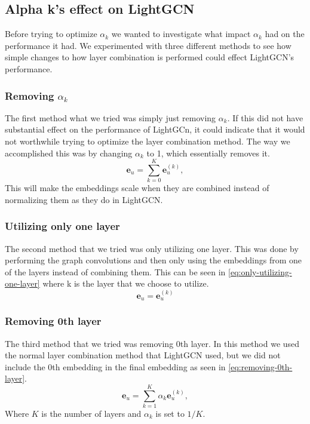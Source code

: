 \subsection{Alpha k's effect on LightGCN}\label{sec:method:alpha-k-effect}
Before trying to optimize $\alpha_k$ we wanted to investigate what impact $\alpha_k$ had on the performance it had.
We experimented with three different methods to see how simple changes to how layer combination is performed could effect LightGCN's performance.

\subsubsection{Removing $\alpha_k$}
The first method what we tried was simply just removing $\alpha_k$.
If this did not have substantial effect on the performance of LightGCn, it could indicate that it would not worthwhile trying to optimize the layer combination method.
The way we accomplished this was by changing $\alpha_k$ to 1, which essentially removes it.
\begin{equation}
    \mathbf{e}_u = \sum_{k=0}^{K} \mathbf{e}_u^{(k)},
    \label{eq:removing-alpha-k-lightgcn-sum}
\end{equation}
This will make the embeddings scale when they are combined instead of normalizing them as they do in LightGCN.

\subsubsection{Utilizing only one layer}
The second method that we tried was only utilizing one layer.
This was done by performing the graph convolutions and then only using the embeddings from one of the layers instead of combining them.
This can be seen in \autoref{eq:only-utilizing-one-layer} where k is the layer that we choose to utilize. 
\begin{equation}
	\mathbf{e}_u = \mathbf{e}_u^{(k)}
	\label{eq:only-utilizing-one-layer}
\end{equation}

\subsubsection{Removing 0th layer}
The third method that we tried was removing 0th layer.
In this method we used the normal layer combination method that LightGCN used, but we did not include the 0th embedding in the final embedding as seen in \autoref{eq:removing-0th-layer}.
\begin{equation}
	\mathbf{e}_u = \sum_{k=1}^{K} \alpha_k \mathbf{e}_u^{(k)},
	\label{eq:removing-0th-layer}
\end{equation}
Where $K$ is the number of layers and $\alpha_k$ is set to $1/K$.
